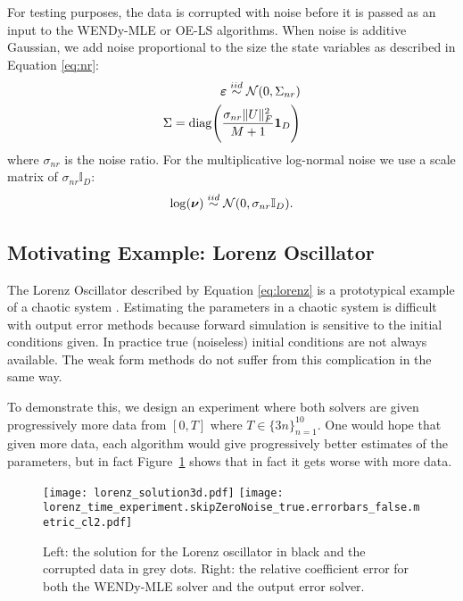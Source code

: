 For testing purposes, the data is corrupted with noise before it is passed as an input to the WENDy-MLE or OE-LS algorithms. When noise is additive Gaussian, we add noise proportional to the size the state variables as described in Equation \eqref{eq:nr}:
\begin{equation} \label{eq:nr}
	\begin{split}
		\boldsymbol{\varepsilon} \stackrel{iid}{\sim} \mathcal{N}(0, \Sigma_{nr})\\
		\Sigma = \operatorname{diag}\Biggl(\frac{\sigma_{nr} \|U\|_F^2}{M+1}\mathbf{1}_D\Biggr)
	\end{split}
\end{equation}
where $\sigma_{nr}$ is the noise ratio. For the multiplicative log-normal noise we use a scale matrix of $\sigma_{nr}\mathbb{I}_D$: 
\begin{equation} \label{eq:lognr}
	\begin{split}
		\log(\boldsymbol{\nu}) \stackrel{iid}{\sim} \mathcal{N}(0, \sigma_{nr}\mathbb{I}_D).
	\end{split}
\end{equation}

\subsection{Motivating Example: Lorenz Oscillator} \label{sec:motiv}

The Lorenz Oscillator described by Equation \eqref{eq:lorenz} is a prototypical example of a chaotic system \citep{Sparrow1982}. Estimating the parameters in a chaotic system is difficult with output error methods because forward simulation is sensitive to the initial conditions given. In practice true (noiseless) initial conditions are not always available. The weak form methods do not suffer from this complication in the same way. 

To demonstrate this, we design an experiment where both solvers are given progressively more data from $[0, T]$ where $T \in \{3n\}_{n=1}^{10}$. One would hope that given more data, each algorithm would give progressively better estimates of the parameters, but in fact Figure~\ref{fig:lorenz_experiment} shows that in fact it gets worse with more data.

\begin{figure}[H]
	\centering
	\texttt{[image: lorenz\_solution3d.pdf]}
	\texttt{[image: lorenz\_time\_experiment.skipZeroNoise\_true.errorbars\_false.metric\_cl2.pdf]}
	\caption{Left: the solution for the Lorenz oscillator in black and the corrupted data in grey dots. Right: the relative coefficient error for both the WENDy-MLE solver and the output error solver. }
	\label{fig:lorenz_experiment}
\end{figure}

